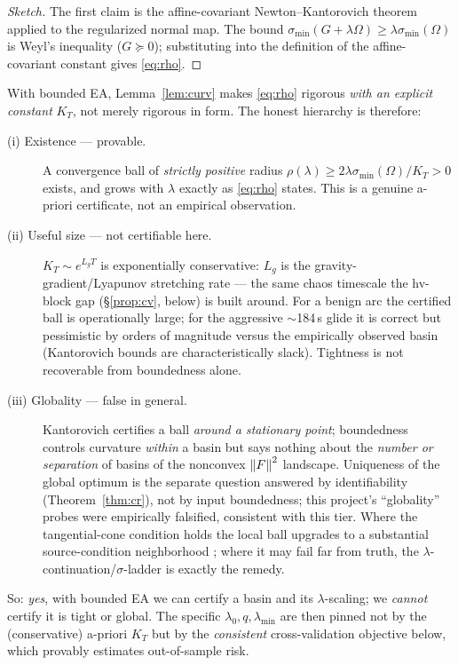 \begin{proof}[Sketch]
The first claim is the affine-covariant Newton--Kantorovich theorem
\cite{deuflhard2004} applied to the regularized normal map. The bound
$\sigma_{\min}(G+\lambda\Omega)\ge\lambda\sigma_{\min}(\Omega)$ is
Weyl's inequality ($G\succeq0$); substituting into the definition of the
affine-covariant constant gives \eqref{eq:rho}.
\end{proof}

\begin{remark}
With bounded EA, Lemma~\ref{lem:curv} makes \eqref{eq:rho} rigorous
\emph{with an explicit constant} $K_T$, not merely rigorous in form. The
honest hierarchy is therefore:
\begin{description}
\item[(i) Existence --- provable.] A convergence ball of \emph{strictly
positive} radius $\rho(\lambda)\ge 2\lambda\sigma_{\min}(\Omega)/K_T>0$
exists, and grows with $\lambda$ exactly as \eqref{eq:rho} states. This is
a genuine a-priori certificate, not an empirical observation.
\item[(ii) Useful size --- not certifiable here.] $K_T\sim e^{L_gT}$ is
exponentially conservative: $L_g$ is the gravity-gradient/Lyapunov
stretching rate --- the same chaos timescale the hv-block gap
(\S\ref{prop:cv}, below) is built around. For a benign arc the certified
ball is operationally large; for the aggressive $\sim$184\,s glide it is
correct but pessimistic by orders of magnitude versus the empirically
observed basin (Kantorovich bounds are characteristically slack). Tightness
is not recoverable from boundedness alone.
\item[(iii) Globality --- false in general.] Kantorovich certifies a ball
\emph{around a stationary point}; boundedness controls curvature
\emph{within} a basin but says nothing about the \emph{number or
separation} of basins of the nonconvex $\left\lVert F\right\rVert^2$ landscape. Uniqueness
of the global optimum is the separate question answered by identifiability
(Theorem~\ref{thm:cr}), not by input boundedness; this project's
``globality'' probes were empirically falsified, consistent with this
tier. Where the tangential-cone condition holds the local ball upgrades to
a substantial source-condition neighborhood
\cite{kaltenbacher2008}; where it may fail far from truth, the
$\lambda$-continuation/$\sigma$-ladder is exactly the remedy.
\end{description}
So: \emph{yes}, with bounded EA we can certify a basin and its
$\lambda$-scaling; we \emph{cannot} certify it is tight or global. The
specific $\lambda_0,q,\lambda_{\min}$ are then pinned not by the
(conservative) a-priori $K_T$ but by the \emph{consistent}
cross-validation objective below, which provably estimates out-of-sample
risk.
\end{remark}

